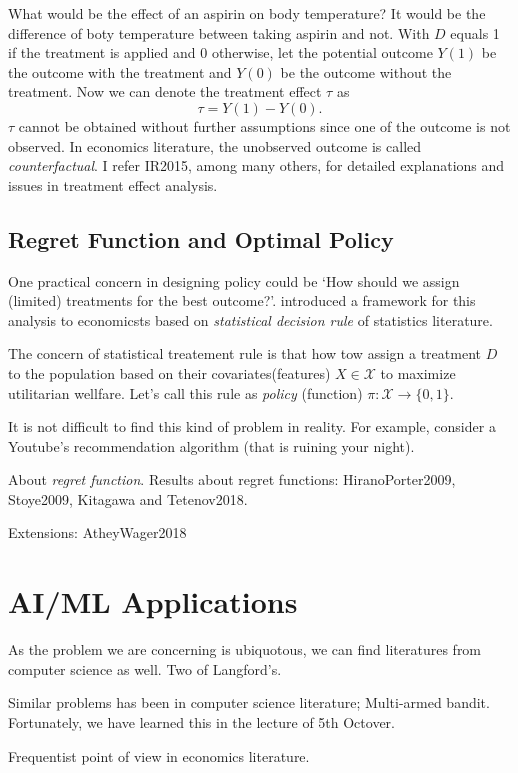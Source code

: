 \documentclass[11pt]{article}
\begin{document}
	What would be the effect of an aspirin on body temperature? It would be the difference of boty temperature between taking aspirin and not. With $D$ equals 1 if the treatment is applied and 0 otherwise, let the potential outcome $Y(1)$ be the outcome with the treatment and $Y(0)$ be the outcome without the treatment. Now we can denote the treatment effect $\tau$ as
	$$
	\tau = Y(1) - Y(0).
	$$
	$\tau$ cannot be obtained without further assumptions since one of the outcome is not observed. In economics literature, the unobserved outcome is called \textit{counterfactual}. I refer IR2015, among many others,  for detailed explanations and issues in treatment effect analysis.
	
	\subsection*{Regret Function and Optimal Policy}
	One practical concern in designing policy could be `How should we assign (limited) treatments for the best outcome?'.
	 \cite{Manski.2004} introduced a framework for this analysis to economicsts based on \textit{statistical decision rule} of statistics literature.
	 
	 The concern of statistical treatement rule is that how tow assign a treatment $D$ to the population based on their covariates(features) $X \in \mathcal{X}$ to maximize utilitarian wellfare. Let's call this rule as \textit{policy} (function) $\pi:\mathcal{X} \rightarrow \{0,1\}$. 
	 
	 It is not difficult to find this kind of problem in reality. For example, consider a Youtube's recommendation algorithm (that is ruining your night).
	 
	 About \textit{regret function}. Results about regret functions: HiranoPorter2009, Stoye2009, Kitagawa and Tetenov2018.
	
	Extensions: AtheyWager2018

	\section{AI/ML Applications}
	As the problem we are concerning is ubiquotous, we can find literatures from computer science as well. Two of Langford's.
	
	Similar problems has been in computer science literature; Multi-armed bandit. Fortunately, we have learned this in the lecture of 5th Octover.
	
	Frequentist point of view in economics literature.
	
\end{document}
